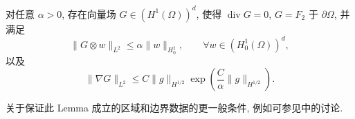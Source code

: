 \begin{Lemma}
\label{lem:chap5-hopf-lifting}
对任意 $\alpha>0$, 存在向量场 $G\in(H^1(\Omega))^d$, 使得 $\operatorname{div}G=0$, $G=F_2$ 于 $\partial\Omega$, 并满足
\begin{equation}
 \|G\otimes w\|_{L^2}\leq\alpha\|w\|_{H_0^1},
 \qquad\forall w\in(H_0^1(\Omega))^d,
\label{eq:chap5-hopf-weak-smallness}
\end{equation}
以及
\begin{equation}
 \|\nabla G\|_{L^2}
 \leq C\|g\|_{H^{1/2}}
 \exp\!\left(\frac C\alpha\|g\|_{H^{1/2}}\right).
\label{eq:chap5-hopf-gradient-estimate}
\end{equation}
\end{Lemma}

关于保证此 Lemma 成立的区域和边界数据的更一般条件, 例如可参见中的讨论.

